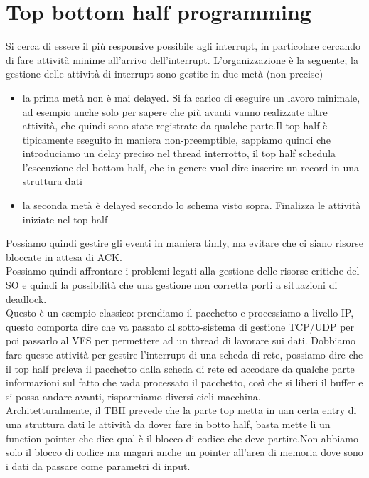 \documentclass[12pt, oneside]{extbook}
\begin{document}
\section{Top bottom half programming}
Si cerca di essere il più responsive possibile agli interrupt, in particolare cercando di fare attività minime all'arrivo dell'interrupt. L'organizzazione è la seguente; la gestione delle attività di interrupt sono gestite in due metà (non precise)
\begin{itemize}
\item la prima metà non è mai delayed. Si fa carico di eseguire un lavoro minimale, ad esempio anche solo per sapere che più avanti vanno realizzate altre attività, che quindi sono state registrate da qualche parte.Il top half è tipicamente eseguito in maniera non-preemptible, sappiamo quindi che introduciamo un delay preciso nel thread interrotto, il top half schedula l'esecuzione del bottom half, che in genere vuol dire inserire un record in una struttura dati
\item la seconda metà è delayed secondo lo schema visto sopra. Finalizza le attività iniziate nel top half
\end{itemize}
Possiamo quindi gestire gli eventi in maniera timly, ma evitare che ci siano risorse bloccate in attesa di ACK.\\Possiamo quindi affrontare i problemi legati alla gestione delle risorse critiche del SO e quindi la possibilità che una gestione non corretta porti a situazioni di deadlock.\\Questo è un esempio classico:
prendiamo il pacchetto e processiamo a livello IP, questo comporta dire che va passato al sotto-sistema di gestione TCP/UDP per poi passarlo al VFS per permettere ad un thread di lavorare sui dati. Dobbiamo fare queste attività per gestire l'interrupt di una scheda di rete, possiamo dire che il top half preleva il pacchetto dalla scheda di rete ed accodare da qualche parte informazioni sul fatto che vada processato il pacchetto, così che si liberi il buffer e si possa andare avanti, risparmiamo diversi cicli macchina.\\
Architetturalmente, il TBH prevede che la parte top metta in uan certa entry di una struttura dati le attività da dover fare in botto half, basta mette lì un function pointer che dice qual è il blocco di codice che deve partire.Non abbiamo solo il blocco di codice ma magari anche un pointer all'area di memoria dove sono i dati da passare come parametri di input.
\end{document}
